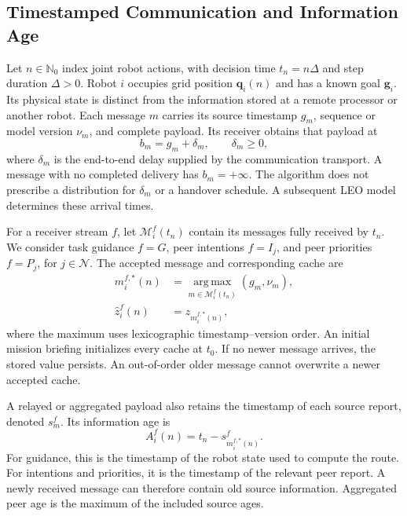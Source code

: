 \begin{panamaaddition}
\subsection{Timestamped Communication and Information Age}
Let $n\in\mathbb{N}_0$ index joint robot actions, with decision time
$t_n=n\Delta$ and step duration $\Delta>0$. Robot $i$ occupies grid position
$\mathbf{q}_i(n)$ and has a known goal $\mathbf{g}_i$. Its physical state is
distinct from the information stored at a remote processor or another robot.
Each message $m$ carries its source timestamp $g_m$, sequence or model version
$\nu_m$, and complete payload. Its receiver obtains that payload at
\begin{equation}
 b_m=g_m+\delta_m,\qquad \delta_m\geq0,
 \label{eq:panama-arrival}
\end{equation}
where $\delta_m$ is the end-to-end delay supplied by the communication
transport. A message with no completed delivery has $b_m=+\infty$. The
algorithm does not prescribe a distribution for $\delta_m$ or a handover
schedule. A subsequent LEO model determines these arrival times.

For a receiver stream $f$, let $\mathcal{M}_i^f(t_n)$ contain its messages
fully received by $t_n$. We consider task guidance $f=G$, peer intentions
$f=I_j$, and peer priorities $f=P_j$, for $j\in\mathcal{N}$. The accepted
message and corresponding cache are
\begin{align}
 m_i^{f,*}(n)&=\operatorname*{arg\,max}_{m\in\mathcal{M}_i^f(t_n)}
                         (g_m,\nu_m),\label{eq:panama-cache}\\
 \widehat{z}_i^f(n)&=z_{m_i^{f,*}(n)},
\end{align}
where the maximum uses lexicographic timestamp--version order. An initial
mission briefing initializes every cache at $t_0$. If no newer message
arrives, the stored value persists. An out-of-order older message cannot
overwrite a newer accepted cache.

A relayed or aggregated payload also retains the timestamp of each source
report, denoted $s_m^f$. Its information age is
\begin{equation}
 A_i^f(n)=t_n-s_{m_i^{f,*}(n)}^f.
 \label{eq:panama-age}
\end{equation}
For guidance, this is the timestamp of the robot state used to compute the
route. For intentions and priorities, it is the timestamp of the relevant
peer report. A newly received message can therefore contain old source
information. Aggregated peer age is the maximum of the included source ages.


\end{panamaaddition}
